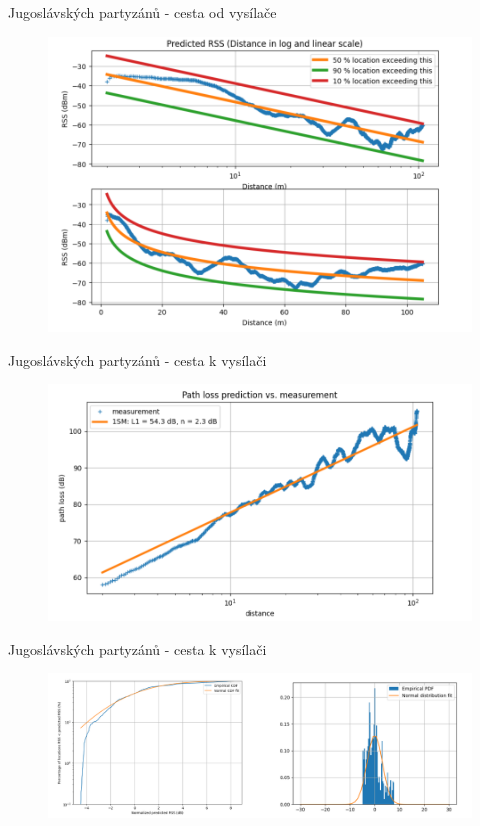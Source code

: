 \documentclass[aspectratio=169, 12pt, hyperref={unicode}]{beamer}
\begin{document}
\begin{frame}{Jugoslávských partyzánů - cesta od vysílače}
	\begin{figure}[!ht]
		\centering
		\includegraphics[width=.6\textwidth]{src/partyzanu-od-vysilace-3.png}
	\end{figure}
\end{frame}
\begin{frame}{Jugoslávských partyzánů - cesta k vysílači}
	\begin{figure}[!ht]
		\centering
		\includegraphics[width=.75\textwidth]{src/partyzanu-k-vysilaci-1.png}
	\end{figure}
\end{frame}
\begin{frame}{Jugoslávských partyzánů - cesta k vysílači}
	\begin{figure}[!ht]
		\centering
		\includegraphics[width=\textwidth]{src/partyzanu-k-vysilaci-2.png}
	\end{figure}
\end{frame}
\end{document}
